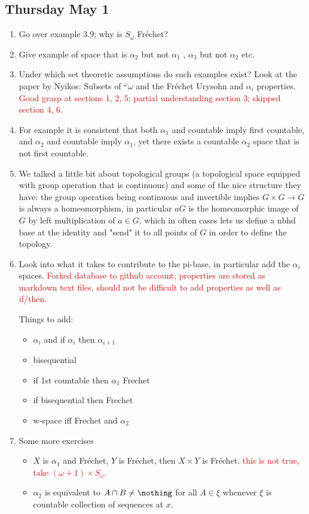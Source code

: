 \documentclass{article}
\begin{document}
\subsection*{Thursday May 1}
\begin{enumerate}
    \item Go over example 3.9; why is \(S_{\omega}\) Fréchet? \checkmark
    \item Give example of space that is \(\alpha_2\) but not \(\alpha_1\) \checkmark, \(\alpha_3\) but not \(\alpha_2\) etc. 
    \item Under which set theoretic assumptions do such examples exist? Look at the paper by Nyikos: Subsets of \(^\omega \omega\) and the Fréchet Urysohn and \(\alpha_i\) properties. \textcolor{red}{Good grasp at sections 1, 2, 5; partial understanding section 3; skipped section 4, 6}.
    
    \item For example it is consistent that both \(\alpha_1\) and countable imply first countable, and \(\alpha_2\) and countable imply  \(\alpha_1\), yet there exists a countable \(\alpha_2\) space that is not first countable.

    \item We talked a little bit about topological groups (a topological space equipped with group operation that is continuous) and some of the nice structure they have: the group operation being continuous and invertible implies \(G\times G \to G\) is always a homeomorphism, in particular \(aG\) is the homeomorphic image of \(G\) by left multiplication of \(a \in G\), which in often cases lets us define a nbhd base at the identity and "send" it to all points of \(G\) in order to define the topology.
    \item Look into what it takes to contribute to the pi-base, in particular add the \(\alpha_i\) spaces.
    \textcolor{red}{Forked database to github account; properties are stored as markdown text files, should not be difficult to add properties as well as if/then.}

    Things to add:
    \begin{itemize}
        \item \(\alpha_i\) and if \(\alpha_i\) then \(\alpha_{i + 1}\)
        \item bisequential
        \item if 1st countable then \(\alpha_1\) Frechet
        \item if bisequential then Frechet
        \item w-space iff Frechet and \(\alpha_2\)   
    \end{itemize}
    \item Some more exercises 
    \begin{itemize}
        \item \(X\) is \(\alpha_1\) and Fréchet, \(Y\) is Fréchet, then \(X \times Y\) is Fréchet. \textcolor{red}{this is not true, take $(\omega + 1) \times S_{\omega}$.}
        \item \(\alpha_2\) is equivalent to \(A \cap B \neq \nothing\) for all \(A \in \xi\) whenever \(\xi\) is countable collection of sequences at \(x\). \checkmark
    \end{itemize}
\end{enumerate}
\end{document}
